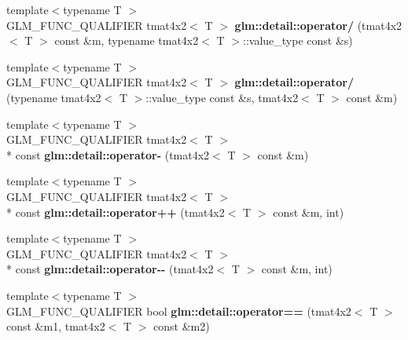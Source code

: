 \begin{DoxyCompactItemize}
\item 
\hypertarget{namespaceglm_1_1detail_ab8546890defe7419e2826cadb3cef7da}{{\footnotesize template$<$typename T $>$ }\\G\-L\-M\-\_\-\-F\-U\-N\-C\-\_\-\-Q\-U\-A\-L\-I\-F\-I\-E\-R tmat4x2$<$ T $>$ {\bfseries glm\-::detail\-::operator/} (tmat4x2$<$ T $>$ const \&m, typename tmat4x2$<$ T $>$\-::value\-\_\-type const \&s)}\label{namespaceglm_1_1detail_ab8546890defe7419e2826cadb3cef7da}

\item 
\hypertarget{namespaceglm_1_1detail_a77d368b48cf81e1a16eb53d7263cee44}{{\footnotesize template$<$typename T $>$ }\\G\-L\-M\-\_\-\-F\-U\-N\-C\-\_\-\-Q\-U\-A\-L\-I\-F\-I\-E\-R tmat4x2$<$ T $>$ {\bfseries glm\-::detail\-::operator/} (typename tmat4x2$<$ T $>$\-::value\-\_\-type const \&s, tmat4x2$<$ T $>$ const \&m)}\label{namespaceglm_1_1detail_a77d368b48cf81e1a16eb53d7263cee44}

\item 
\hypertarget{namespaceglm_1_1detail_a414d6f053af536cae77ed43251069693}{{\footnotesize template$<$typename T $>$ }\\G\-L\-M\-\_\-\-F\-U\-N\-C\-\_\-\-Q\-U\-A\-L\-I\-F\-I\-E\-R tmat4x2$<$ T $>$\\*
 const {\bfseries glm\-::detail\-::operator-\/} (tmat4x2$<$ T $>$ const \&m)}\label{namespaceglm_1_1detail_a414d6f053af536cae77ed43251069693}

\item 
\hypertarget{namespaceglm_1_1detail_a1017c3c6c0c7707bd9ac01372d5b09bb}{{\footnotesize template$<$typename T $>$ }\\G\-L\-M\-\_\-\-F\-U\-N\-C\-\_\-\-Q\-U\-A\-L\-I\-F\-I\-E\-R tmat4x2$<$ T $>$\\*
 const {\bfseries glm\-::detail\-::operator++} (tmat4x2$<$ T $>$ const \&m, int)}\label{namespaceglm_1_1detail_a1017c3c6c0c7707bd9ac01372d5b09bb}

\item 
\hypertarget{namespaceglm_1_1detail_a1df4b2e5549f849e01a4f20c30eddae9}{{\footnotesize template$<$typename T $>$ }\\G\-L\-M\-\_\-\-F\-U\-N\-C\-\_\-\-Q\-U\-A\-L\-I\-F\-I\-E\-R tmat4x2$<$ T $>$\\*
 const {\bfseries glm\-::detail\-::operator-\/-\/} (tmat4x2$<$ T $>$ const \&m, int)}\label{namespaceglm_1_1detail_a1df4b2e5549f849e01a4f20c30eddae9}

\item 
\hypertarget{namespaceglm_1_1detail_a5b244ed973691f786c1669f993544002}{{\footnotesize template$<$typename T $>$ }\\G\-L\-M\-\_\-\-F\-U\-N\-C\-\_\-\-Q\-U\-A\-L\-I\-F\-I\-E\-R bool {\bfseries glm\-::detail\-::operator==} (tmat4x2$<$ T $>$ const \&m1, tmat4x2$<$ T $>$ const \&m2)}\label{namespaceglm_1_1detail_a5b244ed973691f786c1669f993544002}


\end{DoxyCompactItemize}
